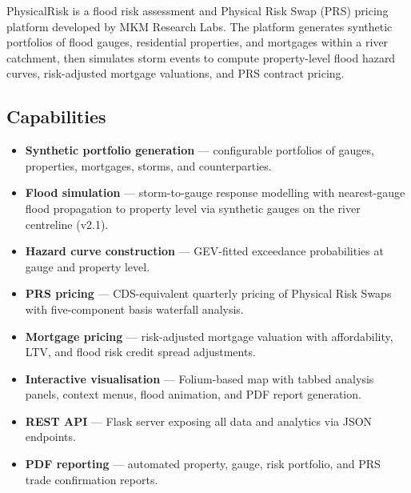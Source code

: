 \documentclass[11pt,a4paper]{article}
\begin{document}
\mkmtitlepage
\mkmlegalpage
\tableofcontents
\clearpage

\mkmexecsummary

PhysicalRisk is a flood risk assessment and Physical Risk Swap (PRS) pricing
platform developed by MKM Research Labs. The platform generates synthetic
portfolios of flood gauges, residential properties, and mortgages within a
river catchment, then simulates storm events to compute property-level flood
hazard curves, risk-adjusted mortgage valuations, and PRS contract pricing.

\subsection{Capabilities}

\begin{itemize}[nosep]
    \item \textbf{Synthetic portfolio generation} --- configurable portfolios of
          gauges, properties, mortgages, storms, and counterparties.
    \item \textbf{Flood simulation} --- storm-to-gauge response modelling with
          nearest-gauge flood propagation to property level via synthetic gauges on the
          river centreline (v2.1).
    \item \textbf{Hazard curve construction} --- GEV-fitted exceedance
          probabilities at gauge and property level.
    \item \textbf{PRS pricing} --- CDS-equivalent quarterly pricing of Physical
          Risk Swaps with five-component basis waterfall analysis.
    \item \textbf{Mortgage pricing} --- risk-adjusted mortgage valuation with
          affordability, LTV, and flood risk credit spread adjustments.
    \item \textbf{Interactive visualisation} --- Folium-based map with tabbed
          analysis panels, context menus, flood animation, and PDF report
          generation.
    \item \textbf{REST API} --- Flask server exposing all data and analytics
          via JSON endpoints.
    \item \textbf{PDF reporting} --- automated property, gauge, risk portfolio,
          and PRS trade confirmation reports.
\end{itemize}
\end{document}
